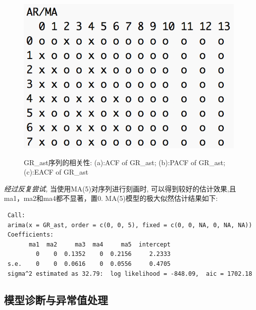 \begin{figure}[h!]
	\hspace{0.04\textwidth}
	\begin{minipage}[ht]{0.3\textwidth}
	\centering
	\includegraphics[width=1\textwidth]{pic/ast/eacf(gr_ast)}
	\subcaption{}\label{eacf(gr_ast)}
\end{minipage}
	\caption{GR\_ast序列的相关性: (a):ACF of GR\_ast; (b):PACF of GR\_ast; (c):EACF of GR\_ast}\label{gr_ast_ape}
\end{figure}
\emph{经过反复尝试,} 当使用MA(5)对序列进行刻画时, 可以得到较好的估计效果,且ma1，ma2和ma4都不显著，置0. MA(5)模型的极大似然估计结果如下:
\begin{framed}
\begin{verbatim}
 Call:
 arima(x = GR_ast, order = c(0, 0, 5), fixed = c(0, 0, NA, 0, NA, NA))
 Coefficients:
       ma1  ma2     ma3  ma4     ma5  intercept
         0    0  0.1352    0  0.2156     2.2333
 s.e.    0    0  0.0616    0  0.0556     0.4705
 sigma^2 estimated as 32.79:  log likelihood = -848.09,  aic = 1702.18
\end{verbatim}
\end{framed}





\subsection{模型诊断与异常值处理}

